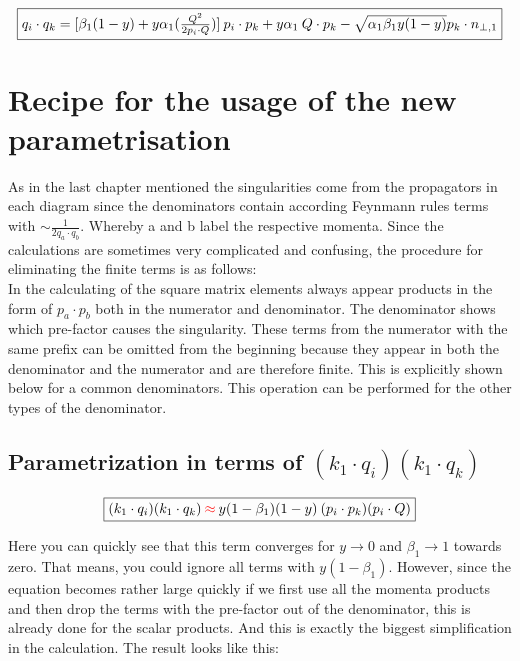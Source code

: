 \begin{equation}
	\begin{aligned}
		\fbox{$  q_i \cdot q_k = [\beta_1 (1-y)+y\alpha_1(\frac{Q^2}{2p_i \cdot Q})]\:p_i \cdot p_k+y\alpha_1\:Q\cdot p_k-\sqrt{\alpha_1\beta_1y(1-y)} p_k \cdot {n_{\bot,1}} $}
    \end{aligned}
\end{equation}
\section{Recipe for the usage of the new parametrisation}
\label{recepie}
As in the last chapter mentioned the singularities come from the propagators in each diagram since the denominators contain according Feynmann rules terms with $\sim \frac{1}{2 q_a \cdot q_b}  $. Whereby a and b label the respective momenta. Since the calculations are sometimes very complicated and confusing, the procedure for eliminating the finite terms is as follows:\\
In the calculating of the square matrix elements always appear products in the form of $ p_a \cdot p_b $ both in the numerator and denominator.
The denominator shows which pre-factor causes the singularity. These terms from the numerator with the same prefix can be omitted from the beginning because they appear in both the denominator and the numerator and are therefore finite. This is explicitly shown below for a common denominators. This operation can be performed for the other types of the denominator.
\subsection{Parametrization in terms of $ (k_1 \cdot q_i )(k_1 \cdot q_k) $} 

\begin{equation}
	\begin{aligned}
		\fbox{$  (k_1 \cdot q_i )(k_1 \cdot q_k) {\color[RGB]{255,0,0} \: \approx\:} y(1-\beta_1) (1-y)\:(p_i \cdot p_k)(p_i \cdot Q) $}
    \end{aligned}
\label{k1qik1qk}
\end{equation}

Here you can quickly see that this term converges for 
$ y \rightarrow 0 $  and $ {\beta}_1 \rightarrow 1 $ towards zero. That means, you could ignore all terms with $  y(1-\beta_1)$. However, since the equation becomes rather large quickly if we first use all the momenta products and then drop the terms with the pre-factor out of the denominator, this is already done for the scalar products. And this is exactly the biggest simplification in the calculation. 
The result looks like this:

